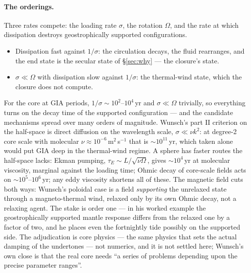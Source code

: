 \documentclass[11pt]{article}
\theoremstyle{definition}
\theoremstyle{remark}
\begin{document}
\paragraph{The orderings.} Three rates compete: the loading rate
$\sigma$, the rotation $\Omega$, and the rate at which dissipation
destroys geostrophically supported configurations.
\begin{itemize}
\item Dissipation fast against $1/\sigma$: the circulation decays, the
  fluid rearranges, and the end state is the secular state of
  \S\ref{sec:why} --- the closure's state.
\item $\sigma \ll \Omega$ with dissipation slow against $1/\sigma$:
  the thermal-wind state, which the closure does not compute.
\end{itemize}
For the core at GIA periods, $1/\sigma \sim 10^2$--$10^4\,$yr and
$\sigma \ll \Omega$ trivially, so everything turns on the decay time
of the supported configuration --- and the candidate mechanisms spread
over many orders of magnitude. Wunsch's part II criterion on the
half-space is direct diffusion on the wavelength scale, $\sigma \ll
\nu k^2$: at degree-2 core scale with molecular $\nu \approx
10^{-6}\,$m$^2\,$s$^{-1}$ that is $\sim 10^{11}\,$yr, which taken
alone would put GIA deep in the thermal-wind regime. A sphere has
faster routes the half-space lacks: Ekman pumping, $\tau_E \sim
L/\sqrt{\nu\Omega}$, gives $\sim 10^4\,$yr at molecular viscosity,
marginal against the loading time; Ohmic decay of core-scale fields
acts on $\sim 10^5$--$10^6\,$yr; any eddy viscosity shortens all of
these. The magnetic field cuts both ways: Wunsch's poloidal case is a
field \emph{supporting} the unrelaxed state through a magneto-thermal
wind, relaxed only by its own Ohmic decay, not a relaxing agent. The
stake is order one --- in his worked example the geostrophically
supported mantle response differs from the relaxed one by a factor of
two, and he places even the fortnightly tide possibly on the supported
side. The adjudication is core physics --- the same physics that sets
the actual damping of the undertones --- not numerics, and it is not
settled here; Wunsch's own close is that the real core needs ``a
series of problems depending upon the precise parameter ranges''.
\end{document}
